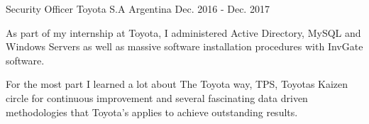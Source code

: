 \begin{cventries}


	\cventry
	{Security Officer} %
	{Toyota S.A} %
	{Argentina} %
	{Dec. 2016 - Dec. 2017} %
	{
		\begin{cvitems} %
			\item {As part of my internship at Toyota, I administered Active Directory, MySQL and Windows Servers as well as massive software installation procedures with InvGate software.}
			\item {For the most part I learned a lot about The Toyota way, TPS, Toyotas Kaizen circle for continuous improvement and several fascinating data driven methodologies that Toyota's applies to achieve outstanding results.}
		\end{cvitems}
	}
\end{cventries}
